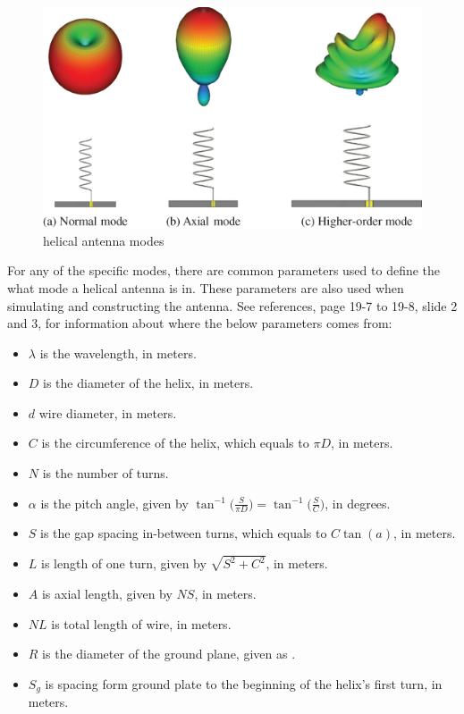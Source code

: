 \begin{figure}[h]
\centering
\includegraphics[scale=1.3]{figures/HelicalMode.png}
\caption{helical antenna modes\cite{HelicalMode}}
\end{figure}

For any of the specific modes, there are common parameters used to define the what mode a helical antenna is in. These parameters are also used when simulating and constructing the antenna. See references, \cite{ARRL} page 19-7 to 19-8, \cite{HelicalModeMath} slide 2 and 3, for information about where the below parameters comes from:

\begin{itemize}
  \item $\lambda$ is the wavelength, in meters.    
  \item $D$ is the diameter of the helix, in meters.
  \item $d$ wire diameter, in meters.
  \item $C$ is the circumference of the helix, which equals to $\pi D$, in meters.
  \item $N$ is the number of turns.
  \item $\alpha$ is the pitch angle, given by $\tan^{-1}\Big(\frac{S}{\pi D}\Big)=\tan^{-1}\Big(\frac{S}{C}\Big)$, in degrees.
  \item $S$ is the gap spacing in-between turns, which equals to $C \tan(a)$, in meters.
  \item $L$ is length of one turn, given by $\sqrt{S^2+C^2}$, in meters.
  \item $A$ is axial length, given by $NS$, in meters.
  \item $NL$ is total length of wire, in meters.
  \item $R$ is the diameter of the ground plane, given as .
  \item $S_g$ is spacing form ground plate to the beginning of the helix's first turn, in meters.
\end{itemize}


